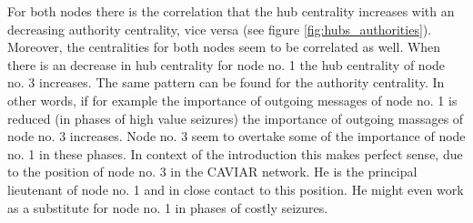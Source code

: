 For both nodes there is the correlation that the hub centrality increases with an decreasing authority centrality, vice versa (see figure \ref{fig:hubs_authorities}). Moreover, the centralities for both nodes seem to be correlated as well. When there is an decrease in hub centrality for node no. 1 the hub centrality of node no. 3 increases. The same pattern can be found for the authority centrality. In other words, if for example the importance of outgoing messages of node no. 1 is reduced (in phases of high value seizures) the importance of outgoing massages of node no. 3 increases. Node no. 3 seem to overtake some of the importance of node no. 1 in these phases. In context of the introduction this makes perfect sense, due to the position of node no. 3 in the CAVIAR network. He is the principal lieutenant of node no. 1 and in close contact to this position. He might even work as a substitute for node no. 1 in phases of costly seizures.\\
